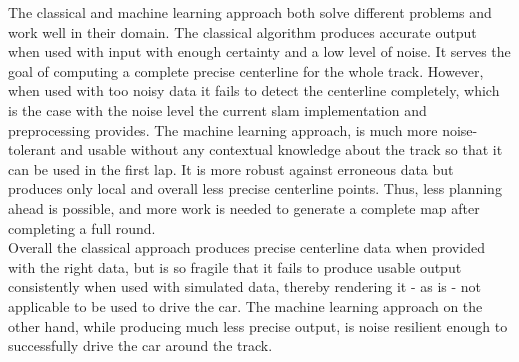The classical and machine learning approach both solve different problems and work well in their domain. The classical algorithm produces accurate output when used with input with enough certainty and a low level of noise. It serves the goal of computing a complete precise centerline for the whole track. However, when used with too noisy data it fails to detect the centerline completely, which is the case with the noise level the current slam implementation and preprocessing provides. The machine learning approach, is much more noise-tolerant and usable without any contextual knowledge about the track so that it can be used in the first lap. It is more robust against erroneous data but produces only local and overall less precise centerline points. Thus, less planning ahead is possible, and more work is needed to generate a complete map after completing a full round.\\
Overall the classical approach produces precise centerline data when provided with the right data, but is so fragile that it fails to produce usable output consistently when used with simulated data, thereby rendering it - as is - not applicable to be used to drive the car. The machine learning approach on the other hand, while producing much less precise output, is noise resilient enough to successfully drive the car around the track.


